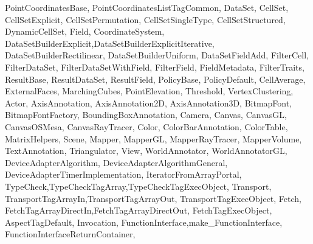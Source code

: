 {{                   PointCoordinatesBase,
                   PointCoordinatesListTagCommon,
                   DataSet,
                   CellSet,
                   CellSetExplicit,
                   CellSetPermutation,
                   CellSetSingleType,
                   CellSetStructured,
                   DynamicCellSet,
                   Field,
                   CoordinateSystem,
                   DataSetBuilderExplicit,DataSetBuilderExplicitIterative,
                   DataSetBuilderRectilinear,
                   DataSetBuilderUniform,
                   DataSetFieldAdd,
                   FilterCell,
                   FilterDataSet,
                   FilterDataSetWithField,
                   FilterField,
                   FieldMetadata,
                   FilterTraits,
                   ResultBase,
                   ResultDataSet,
                   ResultField,
                   PolicyBase,
                   PolicyDefault,
                   CellAverage,
                   ExternalFaces,
                   MarchingCubes,
                   PointElevation,
                   Threshold,
                   VertexClustering,
                   Actor,
                   AxisAnnotation, AxisAnnotation2D, AxisAnnotation3D,
                   BitmapFont, BitmapFontFactory,
                   BoundingBoxAnnotation,
                   Camera,
                   Canvas,
                   CanvasGL,
                   CanvasOSMesa,
                   CanvasRayTracer,
                   Color,
                   ColorBarAnnotation,
                   ColorTable,
                   MatrixHelpers,
                   Scene,
                   Mapper,
                   MapperGL,
                   MapperRayTracer,
                   MapperVolume,
                   TextAnnotation,
                   Triangulator,
                   View,
                   WorldAnnotator, WorldAnnotatorGL,
                   DeviceAdapterAlgorithm, DeviceAdapterAlgorithmGeneral,
                   DeviceAdapterTimerImplementation,
                   IteratorFromArrayPortal,
                   TypeCheck,TypeCheckTagArray,TypeCheckTagExecObject,
                   Transport,
                   TransportTagArrayIn,TransportTagArrayOut,
                   TransportTagExecObject,
                   Fetch,
                   FetchTagArrayDirectIn,FetchTagArrayDirectOut,
                   FetchTagExecObject,
                   AspectTagDefault,
                   Invocation,
                   FunctionInterface,make_FunctionInterface,
                   FunctionInterfaceReturnContainer,
}}
